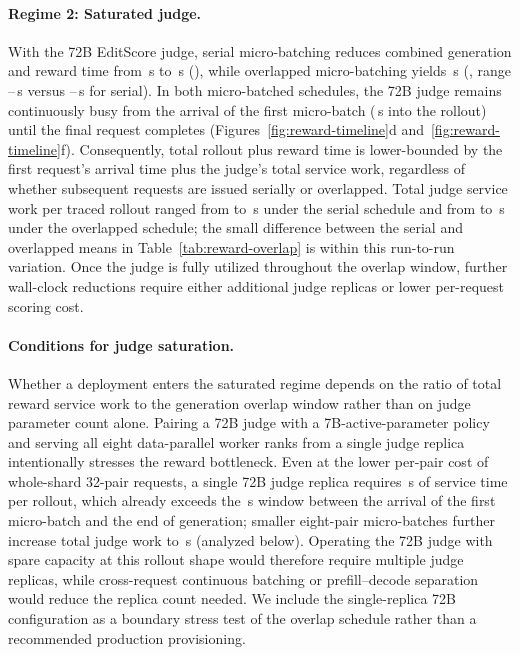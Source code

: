 \paragraph{Regime 2: Saturated judge.}
With the 72B EditScore judge, serial micro-batching reduces combined generation and reward time from \RSLargeBase{}\,s to \RSLargeSerial{}\,s (\RSLargeSerialSaving{}), while overlapped micro-batching yields \RSLargeOverlap{}\,s (\RSLargeOverlapSaving{}, range \RSLargeOverlapMin{}--\RSLargeOverlapMax{}\,s versus \RSLargeSerialMin{}--\RSLargeSerialMax{}\,s for serial).
In both micro-batched schedules, the 72B judge remains continuously busy from the arrival of the first micro-batch (\RSLargeFirstArrival{}\,s into the rollout) until the final request completes (Figures~\ref{fig:reward-timeline}d and~\ref{fig:reward-timeline}f).
Consequently, total rollout plus reward time is lower-bounded by the first request's arrival time plus the judge's total service work, regardless of whether subsequent requests are issued serially or overlapped.
Total judge service work per traced rollout ranged from \RSLargeSerialWorkMin{} to \RSLargeSerialWorkMax{}\,s under the serial schedule and from \RSLargeOverlapWorkMin{} to \RSLargeOverlapWorkMax{}\,s under the overlapped schedule; the small difference between the serial and overlapped means in Table~\ref{tab:reward-overlap} is within this run-to-run variation.
Once the judge is fully utilized throughout the overlap window, further wall-clock reductions require either additional judge replicas or lower per-request scoring cost.

\paragraph{Conditions for judge saturation.}
Whether a deployment enters the saturated regime depends on the ratio of total reward service work to the generation overlap window rather than on judge parameter count alone.
Pairing a 72B judge with a 7B-active-parameter policy and serving all eight data-parallel worker ranks from a single judge replica intentionally stresses the reward bottleneck.
Even at the lower per-pair cost of whole-shard 32-pair requests, a single 72B judge replica requires \RSLargeWholeWork{}\,s of service time per rollout, which already exceeds the \RSLargeWindow{}\,s window between the arrival of the first micro-batch and the end of generation; smaller eight-pair micro-batches further increase total judge work to \RSLargeSerialWork{}\,s (analyzed below).
Operating the 72B judge with spare capacity at this rollout shape would therefore require multiple judge replicas, while cross-request continuous batching or prefill--decode separation would reduce the replica count needed.
We include the single-replica 72B configuration as a boundary stress test of the overlap schedule rather than a recommended production provisioning.

